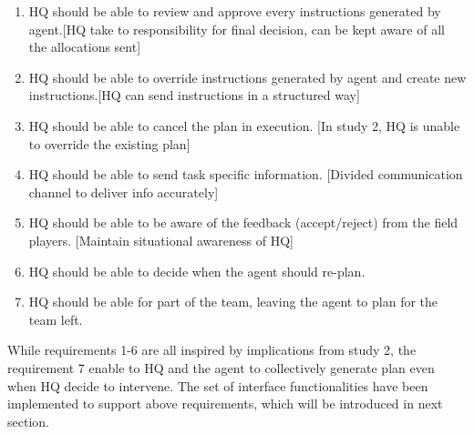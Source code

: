 \begin{enumerate}
\item HQ should be able to review and approve every instructions generated by agent.[HQ take to responsibility for final decision, can be kept aware of all the allocations sent]
\item HQ should be able to override instructions generated by agent and create new instructions.[HQ can send instructions in a structured way]
\item HQ should be able to cancel the plan in execution. [In study 2, HQ is unable to override the existing plan]
\item HQ should be able to send task specific information. [Divided communication channel to deliver info accurately]
\item HQ should be able to be aware of the feedback (accept/reject) from the field players. [Maintain situational awareness of HQ]
\item HQ should be able to decide when the agent should re-plan. 
\item HQ should be able for part of the team, leaving the agent to plan for the team left. 
\end{enumerate}

While requirements 1-6 are all inspired by implications from study 2, the requirement 7 enable to HQ and the agent to collectively generate plan even when HQ decide to intervene. The set of interface functionalities have been implemented to support above requirements, which will be introduced in next section. 


 




